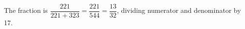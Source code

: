 The fraction is $\dfrac{221}{221+323}=\dfrac{221}{544}=\boxed{\dfrac{13}{32}}$, dividing numerator and denominator by 17.
